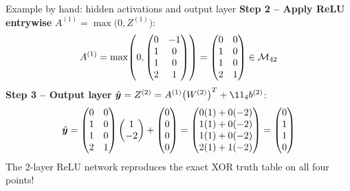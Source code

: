 \documentclass[aspectratio=169]{beamer}\usepackage[]{graphicx}\usepackage[]{xcolor}
\begin{document}
\begin{frame}{Example by hand: hidden activations and output layer}
\textbf{Step 2 -- Apply ReLU entrywise} $A^{(1)} = \max\big(0, Z^{(1)}\big)$:
\[
A^{(1)} = \max\!\left(0, \begin{pmatrix} 0 & -1 \\ 1 & 0 \\ 1 & 0 \\ 2 & 1 \end{pmatrix}\right)
=
\begin{pmatrix} 0 & 0 \\ 1 & 0 \\ 1 & 0 \\ 2 & 1 \end{pmatrix} \in \mathcal{M}_{42}
\]
\vfill
\textbf{Step 3 -- Output layer} $\hat{\by} = Z^{(2)} = A^{(1)} \big(W^{(2)}\big)^T + \11_4 b^{(2)}$:
\[
\hat{\bm{y}} =
\begin{pmatrix} 0 & 0 \\ 1 & 0 \\ 1 & 0 \\ 2 & 1 \end{pmatrix}
\begin{pmatrix} 1 \\ -2 \end{pmatrix}
+
\begin{pmatrix} 0 \\ 0 \\ 0 \\ 0 \end{pmatrix}
=
\begin{pmatrix}
0(1) + 0(-2) \\
1(1) + 0(-2) \\
1(1) + 0(-2) \\
2(1) + 1(-2)
\end{pmatrix}
=
\begin{pmatrix} 0 \\ 1 \\ 1 \\ 0 \end{pmatrix}
\]
\vfill
The 2-layer ReLU network reproduces the exact XOR truth table on all four points!
\end{frame}
\end{document}

